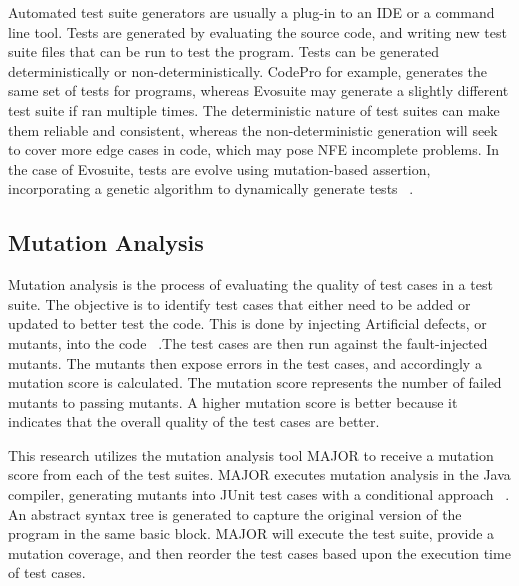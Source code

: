 Automated test suite generators are usually a plug-in to an IDE or a command line tool. Tests are generated by evaluating the source code, and writing new test suite files that can be run to test the program.  Tests can be generated deterministically or non-deterministically. CodePro for example, generates the same set of tests for programs, whereas Evosuite may generate a slightly different test suite if ran multiple times. The deterministic nature of test suites can make them reliable and consistent, whereas the non-deterministic generation will seek to cover more edge cases in code, which may pose NFE incomplete problems. In the case of Evosuite, tests are evolve using mutation-based assertion, incorporating a genetic algorithm to dynamically generate tests ~\cite{Fraser:2011:EAT:2025113.2025179}. 

\subsection{Mutation Analysis}
Mutation analysis is the process of evaluating the quality of test cases in a test suite. The objective is to identify test cases that either need to be added or updated to better test the code. This is done by injecting Artificial defects, or mutants, into the code ~\cite{Fraser:2010:MGU:1831708.1831728}.The test cases are then run against the fault-injected mutants. The mutants then expose errors in the test cases, and accordingly a mutation score is calculated. The mutation score represents the number of failed mutants to passing mutants. A higher mutation score is better because it indicates that the overall quality of the test cases are better. 

This research utilizes the mutation analysis tool MAJOR to receive a mutation score from each of the test suites. MAJOR executes mutation analysis in the Java compiler, generating mutants into JUnit test cases with a conditional approach ~\cite{MAJOR:Just:2011}. An abstract syntax tree is generated to capture the original version of the program in the same basic block. MAJOR will execute the test suite, provide a mutation coverage, and then reorder the test cases based upon the execution time of test cases. 

